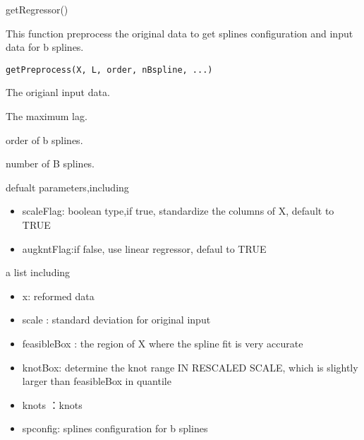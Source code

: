 \documentclass[a4paper]{book}
\begin{document}
%
\begin{Examples}
\begin{ExampleCode}
getRegressor()
\end{ExampleCode}
\end{Examples}
%
\begin{Description}\relax
This function preprocess the original data to get splines configuration and input data for b splines.
\end{Description}
%
\begin{Usage}
\begin{verbatim}
getPreprocess(X, L, order, nBspline, ...)
\end{verbatim}
\end{Usage}
%
\begin{Arguments}
\begin{ldescription}
\item[\code{X}] The origianl input data.

\item[\code{L}] The maximum lag.

\item[\code{order}] order of b splines.

\item[\code{nBspline}] number of B splines.

\item[\code{...}] defualt parameters,including
\begin{itemize}

\item scaleFlag: boolean type,if true, standardize the columns of X, default to TRUE
\item augkntFlag:if false, use linear regressor, defaul to TRUE

\end{itemize}

\end{ldescription}
\end{Arguments}
%
\begin{Value}
a list including
\begin{itemize}

\item x: reformed data
\item scale : standard deviation for original input
\item feasibleBox : the region of X where the spline fit is very accurate
\item knotBox: determine the knot range IN RESCALED SCALE, which is slightly larger than feasibleBox in quantile
\item knots ：knots
\item spconfig: splines configuration for b splines

\end{itemize}

\end{Value}
\end{document}
